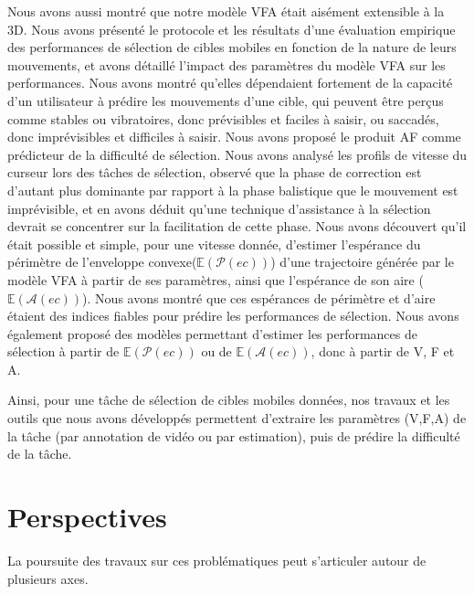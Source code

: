 	Nous avons aussi montré que notre modèle VFA était aisément extensible à la 3D. Nous avons présenté le protocole et les résultats d'une évaluation empirique des performances de sélection de cibles mobiles en fonction de la nature de leurs mouvements, et avons détaillé l'impact des paramètres du modèle VFA sur les performances. Nous avons montré qu'elles dépendaient fortement de la capacité d'un utilisateur à prédire les mouvements d'une cible, qui peuvent être perçus comme stables ou vibratoires, donc prévisibles et faciles à saisir, ou saccadés, donc imprévisibles et difficiles à saisir. Nous avons proposé le produit AF comme prédicteur de la difficulté de sélection. Nous avons analysé les profils de vitesse du curseur lors des tâches de sélection, observé que la phase de correction est d'autant plus dominante par rapport à la phase balistique que le mouvement est imprévisible, et en avons déduit qu'une technique d'assistance à la sélection devrait se concentrer sur la facilitation de cette phase. Nous avons découvert qu'il était possible et simple, pour une vitesse donnée, d'estimer l'espérance du périmètre de l'enveloppe convexe($\mathbb{E}(\mathcal{P}(ec))$) d'une trajectoire générée par le modèle VFA à partir de ses paramètres, ainsi que l'espérance de son aire ($\mathbb{E}(\mathcal{A}(ec))$). Nous avons montré que ces espérances de périmètre et d'aire étaient des indices fiables pour prédire les performances de sélection. Nous avons également proposé des modèles permettant d'estimer les performances de sélection à partir de $\mathbb{E}(\mathcal{P}(ec))$ ou de $\mathbb{E}(\mathcal{A}(ec))$, donc à partir de V, F et A.
	
	Ainsi, pour une tâche de sélection de cibles mobiles données, nos travaux et les outils que nous avons développés permettent d'extraire les paramètres (V,F,A) de la tâche (par annotation de vidéo ou par estimation), puis de prédire la difficulté de la tâche.
	
	
	
	\section*{Perspectives}
	La poursuite des travaux sur ces problématiques peut s'articuler autour de plusieurs axes.
	
